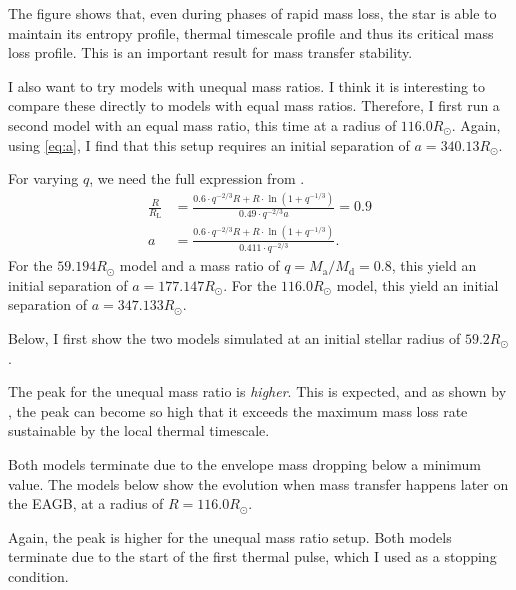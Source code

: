 \documentclass[a4paper,10pt]{article}
\begin{document}
    The figure shows that, even during phases of rapid mass loss, the star is able to maintain its entropy profile, thermal timescale profile and thus its critical mass loss profile. This is an important result for mass transfer stability.

   I also want to try models with unequal mass ratios. I think it is interesting to compare these directly to models with equal mass ratios. Therefore, I first run a second model with an equal mass ratio, this time at a radius of \(116.0R_\odot \). Again, using \eqref{eq:a}, I find that this setup requires an initial separation of \(a = 340.13R_\odot \).

    For varying \(q\), we need the full expression from \citet{eggleton1983}.
    \begin{align*}
        \frac{R}{R _\text{L}} & = \frac{0.6\cdot  q^{-2 / 3}R + R \cdot \ln (1 + q^{- 1/ 3} )}{0.49 \cdot q^{-2 / 3}a } = 0.9\\
        a &= \frac{0.6\cdot  q^{-2 / 3}R + R \cdot \ln (1 + q^{- 1/ 3} )}{0.411\cdot  q^{-2 / 3}}.
    \end{align*}
    For the \(59.194R_\odot \) model and a mass ratio of \(q = M _\text{a} / M _\text{d} = 0.8\), this yield an initial separation of \(a = 177.147R_\odot \). For the \(116.0R_\odot \) model, this yield an initial separation of \(a = 347.133R_\odot \).

    Below, I first show the two models simulated at an initial stellar radius of \(59.2R_\odot \).

\begin{figure}[ht]
    \centering
\end{figure}

The peak for the unequal mass ratio is \emph{higher}. This is expected, and as shown by \citet{temmink2022}, the peak can become so high that it exceeds the maximum mass loss rate sustainable by the local thermal timescale.

Both models terminate due to the envelope mass dropping below a minimum value. The models below show the evolution when mass transfer happens later on the EAGB, at a radius of \(R=116.0R_\odot \).

\begin{figure}[ht]
    \centering
\end{figure}
Again, the peak is higher for the unequal mass ratio setup. Both models terminate due to the start of the first thermal pulse, which I used as a stopping condition.
\end{document}
